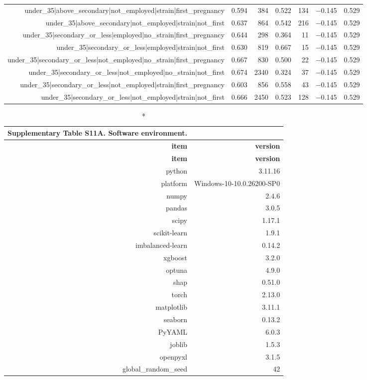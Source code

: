 \documentclass[10pt]{article}
\begin{document}
\begin{longtable}{rrrrrrr}
under\_35|above\_secondary|not\_employed|strain|first\_pregnancy & 0.594 & 384 & 0.522 & 134 & $-$0.145 & 0.529 \\
under\_35|above\_secondary|not\_employed|strain|not\_first & 0.637 & 864 & 0.542 & 216 & $-$0.145 & 0.529 \\
under\_35|secondary\_or\_less|employed|no\_strain|first\_pregnancy & 0.644 & 298 & 0.364 & 11 & $-$0.145 & 0.529 \\
under\_35|secondary\_or\_less|employed|strain|not\_first & 0.630 & 819 & 0.667 & 15 & $-$0.145 & 0.529 \\
under\_35|secondary\_or\_less|not\_employed|no\_strain|first\_pregnancy & 0.667 & 830 & 0.500 & 22 & $-$0.145 & 0.529 \\
under\_35|secondary\_or\_less|not\_employed|no\_strain|not\_first & 0.674 & 2340 & 0.324 & 37 & $-$0.145 & 0.529 \\
under\_35|secondary\_or\_less|not\_employed|strain|first\_pregnancy & 0.603 & 856 & 0.558 & 43 & $-$0.145 & 0.529 \\
under\_35|secondary\_or\_less|not\_employed|strain|not\_first & 0.666 & 2450 & 0.523 & 128 & $-$0.145 & 0.529 \\
\bottomrule
\end{longtable}
\normalsize

\tiny
\setlength{\tabcolsep}{2pt}
\begin{longtable}{rr}
\caption*{\textbf{Supplementary Table S11A.} Software environment.}\\
\toprule
\textbf{item} & \textbf{version} \\
\midrule
\endfirsthead
\toprule
\textbf{item} & \textbf{version} \\
\midrule
\endhead
\bottomrule
\endfoot
python & 3.11.16 \\
platform & Windows-10-10.0.26200-SP0 \\
numpy & 2.4.6 \\
pandas & 3.0.5 \\
scipy & 1.17.1 \\
scikit-learn & 1.9.1 \\
imbalanced-learn & 0.14.2 \\
xgboost & 3.2.0 \\
optuna & 4.9.0 \\
shap & 0.51.0 \\
torch & 2.13.0 \\
matplotlib & 3.11.1 \\
seaborn & 0.13.2 \\
PyYAML & 6.0.3 \\
joblib & 1.5.3 \\
openpyxl & 3.1.5 \\
global\_random\_seed & 42 \\
\bottomrule
\end{longtable}
\normalsize
\end{document}
